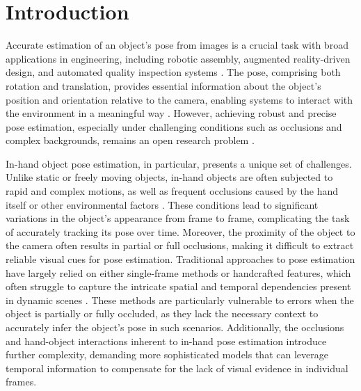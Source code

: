 \section{Introduction}
\label{sec:intro}

Accurate estimation of an object's pose from images is a crucial task with broad applications in engineering, including robotic assembly, augmented reality-driven design, and automated quality inspection systems \cite{marullo20236d, du2021vision, cho2024integration}. The pose, comprising both rotation and translation, provides essential information about the object's position and orientation relative to the camera, enabling systems to interact with the environment in a meaningful way \cite{hoang2024graspability, castro2023crt, peng2019pvnet}. However, achieving robust and precise pose estimation, especially under challenging conditions such as occlusions and complex backgrounds, remains an open research problem \cite{marullo20236d}.

In-hand object pose estimation, in particular, presents a unique set of challenges. Unlike static or freely moving objects, in-hand objects are often subjected to rapid and complex motions, as well as frequent occlusions caused by the hand itself or other environmental factors \cite{chao2021dexycb, garcia2018first, llop2022benchmarking}. These conditions lead to significant variations in the object's appearance from frame to frame, complicating the task of accurately tracking its pose over time. Moreover, the proximity of the object to the camera often results in partial or full occlusions, making it difficult to extract reliable visual cues for pose estimation. Traditional approaches to pose estimation have largely relied on either single-frame methods or handcrafted features, which often struggle to capture the intricate spatial and temporal dependencies present in dynamic scenes \cite{billings2019silhonet, peng2019pvnet}. These methods are particularly vulnerable to errors when the object is partially or fully occluded, as they lack the necessary context to accurately infer the object's pose in such scenarios. Additionally, the occlusions and hand-object interactions inherent to in-hand pose estimation introduce further complexity, demanding more sophisticated models that can leverage temporal information to compensate for the lack of visual evidence in individual frames.

